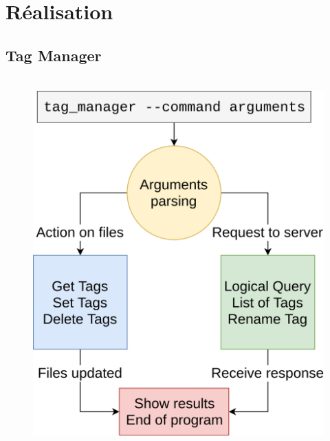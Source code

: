 \documentclass[10pt]{beamer}
\begin{document}
\section{Réalisation}
\subsection{Tag Manager}
\begin{frame}
    \frametitle{\subsecname}
    \begin{columns}[T]
        \begin{column}{.5\textwidth}
            \begin{center}
                \begin{figure}
                    \includegraphics[width=1\textwidth]{images/tag_manager.png}
                \end{figure}
            \end{center}

\end{column}
\end{columns}
\end{frame}
\end{document}
